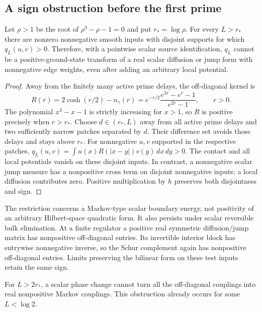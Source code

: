 \subsection{A sign obstruction before the first prime}

\begin{proposition}
\label{obs-scalar-proposition}
Let $\rho>1$ be the root of $\rho^3-\rho-1=0$ and put $r_*=\log\rho$.
For every $L>r_*$ there are nonzero nonnegative smooth inputs with disjoint
supports for which $q_L(u,v)>0$.  Therefore, with a pointwise scalar source
identification, $q_L$ cannot be a positive-ground-state transform of a real
scalar diffusion or jump form with nonnegative edge weights, even after
adding an arbitrary local potential.
\end{proposition}

\begin{proof}
Away from the finitely many active prime delays, the off-diagonal kernel is
\begin{equation}
 R(r)=2\cosh(r/2)-n_\gamma(r)
 =e^{-r/2}\frac{e^{3r}-e^r-1}{e^{2r}-1},\qquad r>0.
 \label{obs-sign-kernel}
\end{equation}
The polynomial $x^3-x-1$ is strictly increasing for $x>1$, so $R$ is
positive precisely when $r>r_*$.  Choose $d\in(r_*,L)$ away from all
active prime delays and two sufficiently narrow patches separated by $d$.
Their difference set avoids those delays and stays above $r_*$.  For
nonnegative $u,v$ supported in the respective patches,
$q_L(u,v)=\int u(x)R(|x-y|)v(y)\,dx\,dy>0$.
The contact and all local potentials vanish on these disjoint inputs.
In contrast, a nonnegative scalar jump measure has a nonpositive cross
term on disjoint nonnegative inputs; a local diffusion contributes zero.
Positive multiplication by $h$ preserves both disjointness and sign.
\end{proof}

The restriction concerns a Markov-type scalar boundary energy, not
positivity of an arbitrary Hilbert-space quadratic form.  It also persists
under scalar reversible bulk elimination.  At a finite regulator a positive
real symmetric diffusion/jump matrix has nonpositive off-diagonal entries.
Its invertible interior block has entrywise nonnegative inverse, so the
Schur complement again has nonpositive off-diagonal entries.  Limits
preserving the bilinear form on these test inputs retain the same sign.

\begin{proposition}
\label{obs-phase-proposition}
For $L>2r_*$, a scalar phase change cannot turn all the off-diagonal
couplings into real nonpositive Markov couplings.  This obstruction already
occurs for some $L<\log2$.
\end{proposition}

